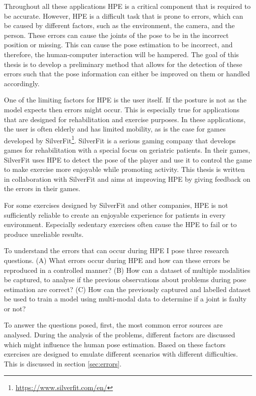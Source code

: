 Throughout all these applications HPE is a critical component that is required to be accurate. However, HPE is a difficult task that is prone to errors\cite{HPEIsHard}, which can be caused by different factors, such as the environment, the camera, and the person. These errors can cause the joints of the pose to be in the incorrect position or missing. This can cause the pose estimation to be incorrect, and therefore, the human-computer interaction will be hampered. The goal of this thesis is to develop a preliminary method that allows for the detection of these errors such that the pose information can either be improved on them or handled accordingly.

One of the limiting factors for HPE is the user itself. If the posture is not as the model expects then errors might occur. This is especially true for applications that are designed for rehabilitation and exercise purposes. In these applications, the user is often elderly and has limited mobility, as is the case for games developed by SilverFit\footnote{\url{https://www.silverfit.com/en/}}. SilverFit is a serious gaming company that develops games for rehabilitation with a special focus on geriatric patients. In their games, SilverFit uses HPE to detect the pose of the player and use it to control the game to make exercise more enjoyable while promoting activity. This thesis is written in collaboration with SilverFit and aims at improving HPE by giving feedback on the errors in their games.

For some exercises designed by SilverFit and other companies, HPE is not sufficiently reliable to create an enjoyable experience for patients in every environment. Especially sedentary exercises often cause the HPE to fail or to produce unreliable results.

To understand the errors that can occur during HPE I pose three research questions. (A) What errors occur during HPE and how can these errors be reproduced in a controlled manner? (B) How can a dataset of multiple modalities be captured, to analyse if the previous observations about problems during pose estimation are correct? (C) How can the previously captured and labelled dataset be used to train a model using multi-modal data to determine if a joint is faulty or not? 

To answer the questions posed, first, the most common error sources are analysed. During the analysis of the problems, different factors are discussed which might influence the human pose estimation. Based on these factors exercises are designed to emulate different scenarios with different difficulties. This is discussed in section \ref{sec:errors}.

